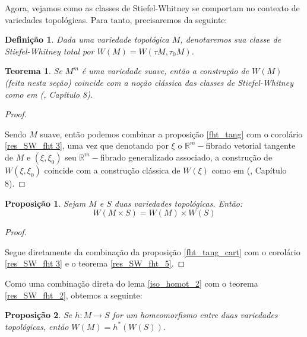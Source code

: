 \documentclass[12pt,oneside]{book} %
\newtheorem{defi}   {\hspace{0.5cm}Defini\c c\~ao}[chapter]
\newtheorem{teo}    {\hspace{0.5cm}Teorema}[chapter]
\newtheorem{prop}   {\hspace{0.5cm}Proposi\c c\~ao}[chapter]
\newcommand{\R}{\mathbb{R}}
\begin{document}
\par Agora, vejamos como as classes de Stiefel-Whitney se comportam no contexto de variedades topológicas. Para tanto, precisaremos da seguinte:

\begin{defi}\label{defi_SW_top}
	Dada uma variedade topológica $M$, denotaremos sua classe de Stiefel-Whitney total por $W(M)=W(\tau M,\tau_{0}M)$.
\end{defi}

\begin{teo}\label{SW_var_suave}
	Se $M^{m}$ é uma variedade suave, então a construção de $W(M)$ (feita nesta seção) coincide com a noção clássica das classes de Stiefel-Whitney como em (\cite{milnor_1}, Capítulo 8).
\end{teo}
\begin{proof}
	
	\
	
	\par Sendo $M$ suave, então podemos combinar a proposição \ref{fht_tang} com o corolário \ref{res_SW_fht 3}, uma vez que denotando por $\xi$ o $\R^{m}-$fibrado vetorial tangente de $M$ e $(\xi,\xi_{0})$ seu $\R^{m}-$fibrado generalizado associado, a construção de $W(\xi,\xi_{0})$ coincide com a construção clássica de $W(\xi)$ como em (\cite{milnor_1}, Capítulo 8).
	
\end{proof}

\begin{prop}\label{res_SW_fht_8}
	Sejam $M$ e $S$ duas variedades topológicas. Então:
	$$ W(M\times S)=W(M)\times W(S) $$
\end{prop}
\begin{proof}
	
	\
	
	\par Segue diretamente da combinação da proposição \ref{fht_tang_cart} com o corolário \ref{res_SW_fht 3} e o teorema \ref{res_SW_fht_5}.
	
\end{proof}

\par Como uma combinação direta do lema \ref{iso_homot_2} com o teorema \ref{res_SW_fht_2}, obtemos a seguinte:

\begin{prop}\label{res_SW_fht_9}
	Se $h:M\to S$ for um homeomorfismo entre duas variedades topológicas, então $W(M)=h^{*}(W(S))$.
\end{prop}
\end{document}
